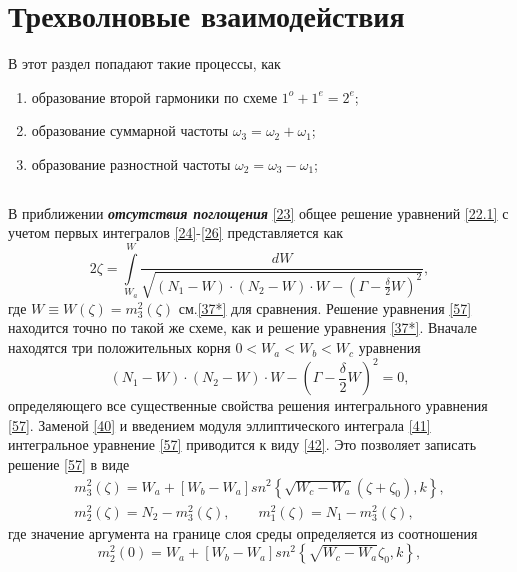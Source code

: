 \documentclass[a4paper]{article}
\begin{document}
	\section{Трехволновые взаимодействия}
	В этот раздел попадают такие процессы, как
	\begin{enumerate}
		\item образование второй гармоники по схеме $1^{o}+1^{e}=2^{e}$;
		\item образование суммарной частоты $\omega_{3}=\omega_{2}+\omega_{1}$;
		\item образование разностной частоты $\omega_{2}=\omega_{3}-\omega_{1}$;
	\end{enumerate}
	\subsection{} В приближении \textbf{\textit{отсутствия поглощения}} \eqref{23} общее решение уравнений \eqref{22.1} с учетом первых интегралов \eqref{24}-\eqref{26} представляется как 
	\begin{equation}
		2\zeta=\int\limits_{W_{a}}^{W}\frac{dW}{\sqrt{(N_{1}-W)\cdot(N_{2}-W)\cdot W-(\Gamma-\frac{\delta}{2}W)^{2}}},\label{57}
	\end{equation}	
	где $W\equiv W(\zeta)=m^{2}_{3}(\zeta)$ см.\eqref{37*} для сравнения. Решение уравнения \eqref{57} находится точно по такой же схеме, как и решение уравнения \eqref{37*}. Вначале находятся три положительных корня $0<W_{a}<W_{b}<W_{c}$  уравнения 
	\begin{equation}
		(N_{1}-W)\cdot(N_{2}-W)\cdot W-\left(\Gamma-\frac{\delta}{2} W\right)^{2}=0,
		\label{58}
	\end{equation}
	определяющего все существенные свойства решения интегрального уравнения \eqref{57}. Заменой \eqref{40} и введением модуля эллиптического интеграла \eqref{41} интегральное уравнение \eqref{57} приводится к виду \eqref{42}. Это позволяет записать решение \eqref{57} в виде 
	\begin{equation}
		\begin{aligned}
			m_{3}^{2}(\zeta)=W_{a}+\left[W_{b}-W_{a}\right]sn^{2}\left\{\sqrt{W_{c}-W_{a}}(\zeta+\zeta_{0}),k\right\},\\
			m_{2}^{2}(\zeta)=N_{2}-m^{2}_{3}(\zeta),\qquad m_{1}^{2}(\zeta)=N_{1}-m_{3}^{2}(\zeta),
			\label{59}
		\end{aligned}
	\end{equation}
	где значение аргумента на границе слоя среды определяется из соотношения 
	\begin{equation}
		m_{2}^{2}(0)=W_{a}+\left[W_{b}-W_{a}\right]sn^{2}\left\{\sqrt{W_{c}-W_{a}}\zeta_{0},k\right\},
		\label{60}
	\end{equation}
\end{document}
